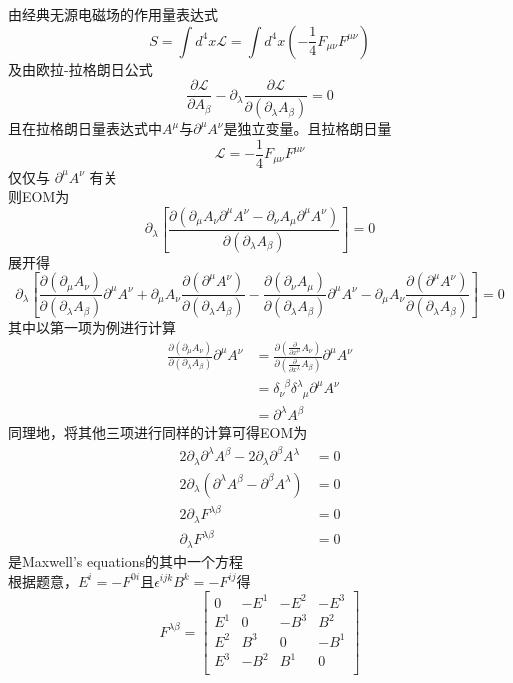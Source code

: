 \documentclass{article}
\begin{document}
由经典无源电磁场的作用量表达式 $$S=\int d^4 x \mathcal{L} =\int d^4 x ( -\frac{1}{4} F_{\mu \nu} F^{\mu \nu} )$$ 及由欧拉-拉格朗日公式$$\frac{\partial \mathcal{L}}{\partial A_{\beta}} - \partial_{\lambda} \frac{\partial \mathcal{L}}{\partial (\partial_{\lambda} A_{\beta})} = 0 $$
且在拉格朗日量表达式中$A^{\mu}$与$\partial^{\mu} A^{\nu}$是独立变量。且拉格朗日量$$\mathcal{L} =  -\frac{1}{4} F_{\mu \nu} F^{\mu \nu} $$ 仅仅与 $\partial^{\mu} A^{\nu}$ 有关 \\
则EOM为
$$\partial_{\lambda} \left[ \frac{\partial(\partial_{\mu} A_{\nu} \partial^{\mu} A^{\nu} - \partial_{\nu} A_{\mu} \partial^{\mu} A^{\nu})}{\partial(\partial_{\lambda} A_{\beta})} \right] = 0 \nonumber $$
展开得
$$
\partial_{\lambda} \left[ \frac{\partial (\partial_{\mu} A_{\nu})}{\partial(\partial_{\lambda} A_{\beta})} \partial^{\mu} A^{\nu} + \partial_{\mu} A_{\nu} \frac{\partial (\partial^{\mu} A^{\nu})}{\partial (\partial_{\lambda} A_{\beta})} - \frac{\partial (\partial_{\nu} A_{\mu})}{\partial (\partial_{\lambda} A_{\beta})} \partial^{\mu} A^{\nu} - \partial_{\mu} A_{\nu} \frac{\partial (\partial^{\mu} A^{\nu})}{\partial (\partial_{\lambda} A_{\beta})} \right] = 0  \nonumber 			   
$$
其中以第一项为例进行计算
\begin{align}
\frac{\partial (\partial_{\mu} A_{\nu})}{\partial(\partial_{\lambda} A_{\beta})} \partial^{\mu} A^{\nu} &=
\frac{\partial (\frac{\partial}{\partial x^{\mu}} A_{\nu})}{\partial(\frac{\partial}{\partial x^{\lambda}} A_{\beta})} \partial^{\mu} A^{\nu} \nonumber \\
	&= \delta_{\nu}^{\phantom{\nu} {\beta}} \delta^{\lambda}_{\phantom{\lambda} {\mu}} \partial^{\mu} A^{\nu}  \nonumber \\
	&= \partial^{\lambda} A^{\beta} \nonumber
\end{align}
同理地，将其他三项进行同样的计算可得EOM为
\begin{align}
2\partial_{\lambda} \partial^{\lambda} A^{\beta} - 2\partial_{\lambda} \partial^{\beta} A^{\lambda} &=0 \nonumber \\
2\partial_{\lambda} (\partial^{\lambda} A^{\beta} - \partial^{\beta} A^{\lambda} ) &=0 \nonumber \\
2\partial_{\lambda} F^{\lambda \beta} &=0 \nonumber \\
\partial_{\lambda} F^{\lambda \beta} &=0 \nonumber 
\end{align}
是Maxwell's equations的其中一个方程\\
根据题意，$E^i = -F^{0i}$且$\epsilon^{ijk}B^{k} = -F^{ij}$得
$$
F^{\lambda \beta} = 
\left[ 
	\begin{matrix}
	0 & -E^1 & -E^2 & -E^3 \\
	E^1 & 0	& -B^3 & B^2 \\
	E^2 & B^3 & 0 & -B^1 \\
	E^3 & -B^2 & B^1 & 0 \\	
	\end{matrix}
\right]
$$
\end{document}
